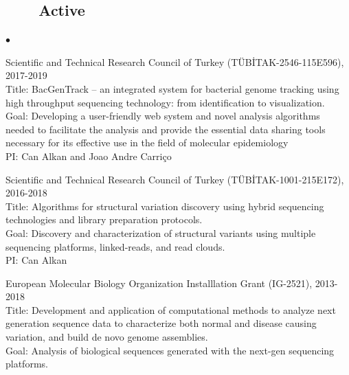 \documentclass[margin,line]{res}
\newenvironment{list2}{
  \begin{list}{$\bullet$}{%
      \setlength{\itemsep}{0in}
      \setlength{\parsep}{0in} \setlength{\parskip}{0in}
      \setlength{\topsep}{0in} \setlength{\partopsep}{0in} 
      \setlength{\leftmargin}{0.2in}}}{\end{list}}
\begin{document}
\begin{resume}
                                       \subsection{\small \sc ~~~~Active}

                                       \begin{list2}
                                       \item
                                         Scientific and Technical Research Council of Turkey (T\"{U}B\.{I}TAK-2546-115E596), 2017-2019\\
                                         Title: BacGenTrack – an integrated system for bacterial genome tracking using high throughput sequencing technology: from identification to visualization.\\
                                         Goal: Developing a user-friendly web system and novel analysis algorithms needed to facilitate the analysis and provide
                                         the essential data sharing tools necessary for its effective use in the field of molecular epidemiology\\
                                         PI: Can Alkan and Joao Andre Carriço
                                       \item
                                         Scientific and Technical Research Council of Turkey (T\"{U}B\.{I}TAK-1001-215E172), 2016-2018\\
                                         Title: Algorithms for structural variation discovery using hybrid sequencing technologies and library preparation protocols.\\
                                         Goal: Discovery and characterization of structural variants using multiple sequencing platforms, linked-reads, and read clouds.\\
                                         PI: Can Alkan
                                       \item
                                         European Molecular Biology Organization Installlation Grant (IG-2521), 2013-2018 \\
                                         Title: Development and application of computational methods to analyze next generation sequence data to characterize both normal and disease causing variation, and build de novo genome assemblies.\\
                                         Goal: Analysis of biological sequences generated with the next-gen sequencing platforms.\\

\end{list2}
\end{resume}
\end{document}
